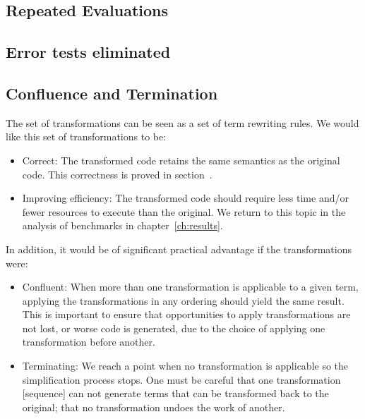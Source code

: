 \subsection{Repeated Evaluations}

\subsection{Error tests eliminated}

\subsection{Confluence and Termination}

The set of transformations can be seen as a set of term rewriting rules. We
would like this set of transformations to be:
%
\begin{itemize}
    \item Correct: The transformed code retains the same semantics as the
        original code. This correctness is proved in
        section~\derp.

    \item Improving efficiency: The transformed code should require less time
        and/or fewer resources to execute than the original. We return to this
        topic in the analysis of benchmarks in chapter~\ref{ch:results}.
\end{itemize}
%
In addition, it would be of significant practical advantage if the
transformations were:
%
\begin{itemize}
    \item Confluent: When more than one transformation is applicable to a given
        term, applying the transformations in any ordering should yield the same
        result. This is important to ensure that opportunities to apply
        transformations are not lost, or worse code is generated, due to
        the choice of applying one transformation before another.

    \item Terminating: We reach a point when no transformation is applicable so
        the simplification process stops. One must be careful that one
        transformation [sequence] can not generate terms that can be transformed
        back to the original; that no transformation undoes the work of another.
\end{itemize}



